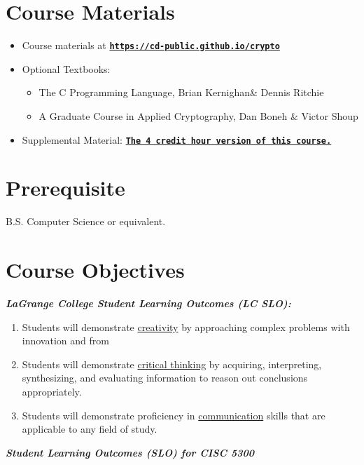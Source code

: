 \documentclass[11pt]{article}
\begin{document}
\section*{Course Materials}

\begin{itemize}
\item Course materials at \href{https://cd-public.github.io/crypto/}{\tt\bf https://cd-public.github.io/crypto}
\item Optional Textbooks: 
\begin{itemize}
\item The C Programming Language, Brian Kernighan\& Dennis Ritchie
\item A Graduate Course in Applied Cryptography, Dan Boneh \& Victor Shoup
\end{itemize}
\item Supplemental Material: \href{https://cd-public.github.io/courses/old/c89s25/index.html/}{\tt\bf The 4 credit hour version of this course.}
\end{itemize}


\section*{Prerequisite}
B.S. Computer Science or equivalent.


\section*{Course Objectives}
\textbf{\textit{LaGrange College Student Learning Outcomes (LC SLO):}}

\begin{enumerate}
\item Students will demonstrate \underline{creativity} by approaching complex problems with innovation and from
\item Students will demonstrate \underline{critical thinking} by acquiring, interpreting, synthesizing, and evaluating
information to reason out conclusions appropriately.
\item Students will demonstrate proficiency in \underline{communication} skills that are applicable to any field of
study.
\end{enumerate}

\textbf{\textit{Student Learning Outcomes (SLO) for CISC 5300}}
\end{document}
